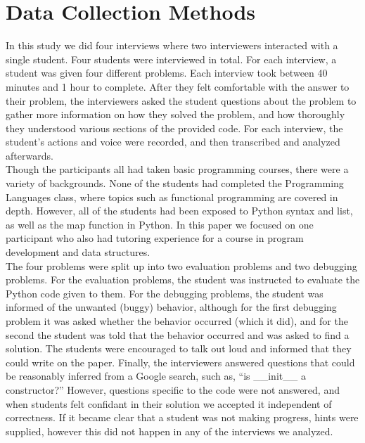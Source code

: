 \section{Data Collection Methods}


In this study we did four interviews where two interviewers interacted with a single student. Four students were interviewed in total.
For each interview, a student was given four different problems. Each interview took between 40 minutes and 1 hour to complete.
After they felt comfortable with the answer to their problem,
 the interviewers asked the student questions about the problem to gather more information on how they solved the problem,
 and how thoroughly they understood various sections of the provided code.
For each interview, the student's actions and voice were recorded, and then transcribed and analyzed afterwards. \\

Though the participants all had taken basic programming courses, there were a variety of backgrounds.
None of the students had completed the Programming Languages class, where topics such as functional programming are covered in depth.
However, all of the students had been exposed to Python syntax and list, as well as the map function in Python.
In this paper we focused on one participant who also had tutoring experience for a course in program development and data structures. \\

The four problems were split up into two evaluation problems and two debugging problems.
For the evaluation problems, the student was instructed to evaluate the Python code given to them.
For the debugging problems, the student was informed of the unwanted (buggy) behavior,
 although for the first debugging problem it was asked whether the behavior occurred (which it did),
 and for the second the student was told that the behavior occurred and was asked to find a solution.
The students were encouraged to talk out loud and informed that they could write on the paper.
Finally, the interviewers answered questions that could be reasonably inferred from a Google search, such as,
``is \_\_init\_\_ a constructor?''
However, questions specific to the code were not answered, and when students felt confidant in their solution we accepted it independent of correctness.
If it became clear that a student was not making progress, hints were supplied, however this did not happen in any of the interviews we analyzed.

